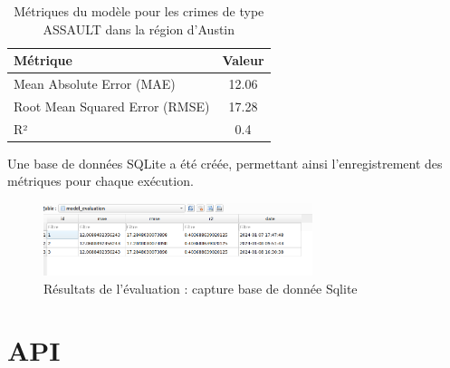 \documentclass[12pt]{article}
\begin{document}
\begin{table}[htbp]
	\centering
	\caption{Métriques du modèle pour les crimes de type ASSAULT dans la région d'Austin}
	\begin{tabular}{|l|c|}
		\hline
		Métrique & Valeur \\
		\hline
		Mean Absolute Error (MAE) & 12.06 \\
		Root Mean Squared Error (RMSE) & 17.28 \\
		R² & 0.4 \\
		\hline
	\end{tabular}
	\label{tab:metrics_assault_austin}
\end{table}
Une base de données SQLite a été créée, permettant ainsi l'enregistrement des métriques pour chaque exécution.
\begin{figure}[htbp]
	\centering
	\includegraphics[width=0.7\textwidth]{Capture_Sqlite.png}
	\caption{Résultats de l'évaluation : capture base de donnée Sqlite}
	\label{fig:assault_austin}
\end{figure}




\section{API}
\end{document}
